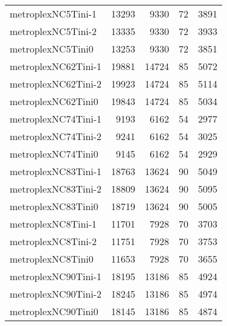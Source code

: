 \begin{longtable}{lrrrr}
metroplexNC5Tini-1 & 13293 & 9330 & 72 & 3891 \\
metroplexNC5Tini-2 & 13335 & 9330 & 72 & 3933 \\
metroplexNC5Tini0 & 13253 & 9330 & 72 & 3851 \\
metroplexNC62Tini-1 & 19881 & 14724 & 85 & 5072 \\
metroplexNC62Tini-2 & 19923 & 14724 & 85 & 5114 \\
metroplexNC62Tini0 & 19843 & 14724 & 85 & 5034 \\
metroplexNC74Tini-1 & 9193 & 6162 & 54 & 2977 \\
metroplexNC74Tini-2 & 9241 & 6162 & 54 & 3025 \\
metroplexNC74Tini0 & 9145 & 6162 & 54 & 2929 \\
metroplexNC83Tini-1 & 18763 & 13624 & 90 & 5049 \\
metroplexNC83Tini-2 & 18809 & 13624 & 90 & 5095 \\
metroplexNC83Tini0 & 18719 & 13624 & 90 & 5005 \\
metroplexNC8Tini-1 & 11701 & 7928 & 70 & 3703 \\
metroplexNC8Tini-2 & 11751 & 7928 & 70 & 3753 \\
metroplexNC8Tini0 & 11653 & 7928 & 70 & 3655 \\
metroplexNC90Tini-1 & 18195 & 13186 & 85 & 4924 \\
metroplexNC90Tini-2 & 18245 & 13186 & 85 & 4974 \\
metroplexNC90Tini0 & 18145 & 13186 & 85 & 4874 \\
\end{longtable}
